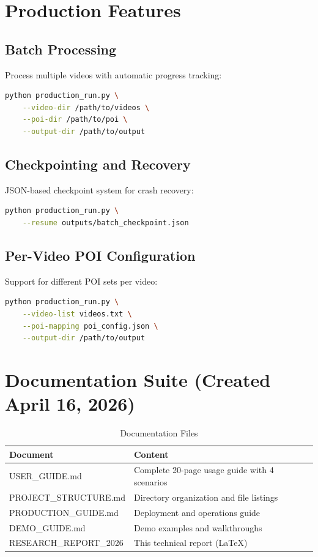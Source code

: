 \documentclass[12pt,a4paper]{article}
\begin{document}
\section{Production Features}

\subsection{Batch Processing}
Process multiple videos with automatic progress tracking:
\begin{lstlisting}[language=bash]
python production_run.py \
    --video-dir /path/to/videos \
    --poi-dir /path/to/poi \
    --output-dir /path/to/output
\end{lstlisting}

\subsection{Checkpointing and Recovery}
JSON-based checkpoint system for crash recovery:
\begin{lstlisting}[language=bash]
python production_run.py \
    --resume outputs/batch_checkpoint.json
\end{lstlisting}

\subsection{Per-Video POI Configuration}
Support for different POI sets per video:
\begin{lstlisting}[language=bash]
python production_run.py \
    --video-list videos.txt \
    --poi-mapping poi_config.json \
    --output-dir /path/to/output
\end{lstlisting}

\section{Documentation Suite (Created April 16, 2026)}

\begin{table}[H]
\centering
\caption{Documentation Files}
\begin{tabular}{lp{7cm}}
\toprule
\textbf{Document} & \textbf{Content} \\
\midrule
USER\_GUIDE.md & Complete 20-page usage guide with 4 scenarios \\
PROJECT\_STRUCTURE.md & Directory organization and file listings \\
PRODUCTION\_GUIDE.md & Deployment and operations guide \\
DEMO\_GUIDE.md & Demo examples and walkthroughs \\
RESEARCH\_REPORT\_2026 & This technical report (LaTeX) \\
\bottomrule
\end{tabular}
\end{table}
\end{document}
